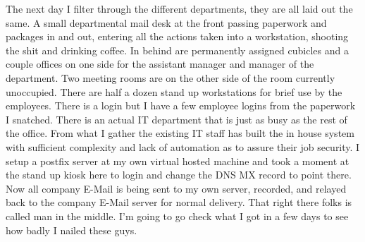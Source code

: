 The next day I filter through the different departments, they are all laid out the same. A small departmental mail desk at the front passing paperwork and packages in and out, entering all the actions taken into a workstation, shooting the shit and drinking coffee. In behind are permanently assigned cubicles and a couple offices on one side for the assistant manager and manager of the department. Two meeting rooms are on the other side of the room currently unoccupied. There are half a dozen stand up workstations for brief use by the employees. There is a login but I have a few employee logins from the paperwork I snatched. There is an actual IT department that is just as busy as the rest of the office. From what I gather the existing IT staff has built the in house system with sufficient complexity and lack of automation as to assure their job security. I setup a postfix server at my own virtual hosted machine and took a moment at the stand up kiosk here to login and change the DNS MX record to point there. Now all company E-Mail is being sent to my own server, recorded, and relayed back to the company E-Mail server for normal delivery. That right there folks is called man in the middle. I'm going to go check what I got in a few days to see how badly I nailed these guys.

